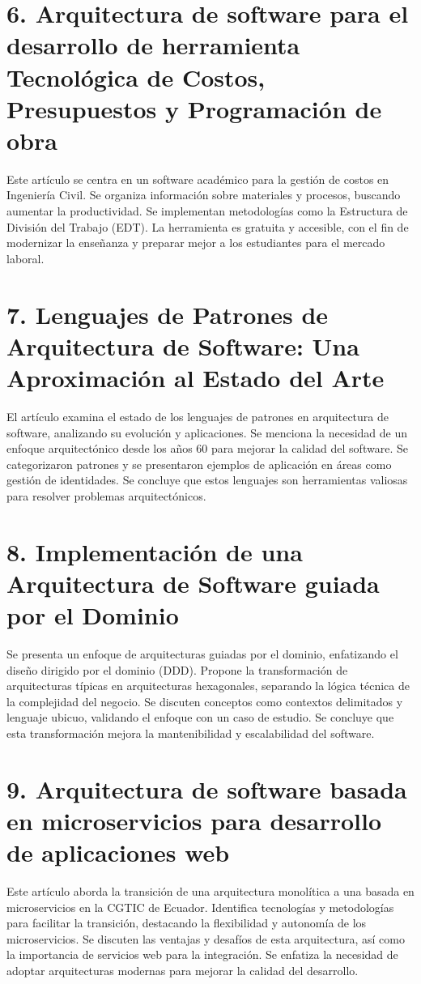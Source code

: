 \documentclass[twocolumn]{article}
\begin{document}
\section*{6. Arquitectura de software para el desarrollo de herramienta Tecnológica de Costos, Presupuestos y Programación de obra}
Este artículo se centra en un software académico para la gestión de costos en Ingeniería Civil. Se organiza información sobre materiales y procesos, buscando aumentar la productividad. Se implementan metodologías como la Estructura de División del Trabajo (EDT). La herramienta es gratuita y accesible, con el fin de modernizar la enseñanza y preparar mejor a los estudiantes para el mercado laboral.


\printbibliography[heading=subbibliography]

\section*{7. Lenguajes de Patrones de Arquitectura de Software: Una Aproximación al Estado del Arte}
El artículo examina el estado de los lenguajes de patrones en arquitectura de software, analizando su evolución y aplicaciones. Se menciona la necesidad de un enfoque arquitectónico desde los años 60 para mejorar la calidad del software. Se categorizaron patrones y se presentaron ejemplos de aplicación en áreas como gestión de identidades. Se concluye que estos lenguajes son herramientas valiosas para resolver problemas arquitectónicos.

\printbibliography[heading=subbibliography]

\section*{8. Implementación de una Arquitectura de Software guiada por el Dominio}
Se presenta un enfoque de arquitecturas guiadas por el dominio, enfatizando el diseño dirigido por el dominio (DDD). Propone la transformación de arquitecturas típicas en arquitecturas hexagonales, separando la lógica técnica de la complejidad del negocio. Se discuten conceptos como contextos delimitados y lenguaje ubicuo, validando el enfoque con un caso de estudio. Se concluye que esta transformación mejora la mantenibilidad y escalabilidad del software.


\printbibliography[heading=subbibliography]

\section*{9. Arquitectura de software basada en microservicios para desarrollo de aplicaciones web}
Este artículo aborda la transición de una arquitectura monolítica a una basada en microservicios en la CGTIC de Ecuador. Identifica tecnologías y metodologías para facilitar la transición, destacando la flexibilidad y autonomía de los microservicios. Se discuten las ventajas y desafíos de esta arquitectura, así como la importancia de servicios web para la integración. Se enfatiza la necesidad de adoptar arquitecturas modernas para mejorar la calidad del desarrollo.
\end{document}
